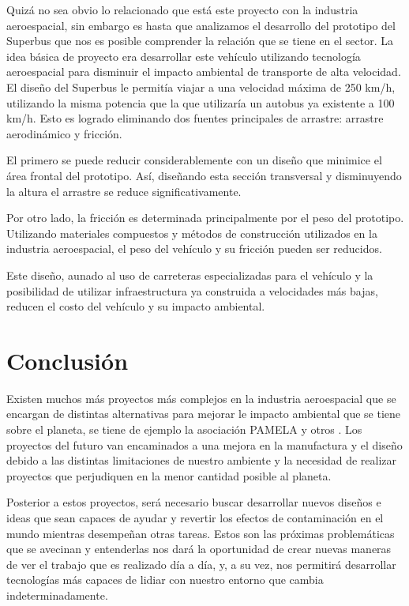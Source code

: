 \documentclass[12pt, letterpaper]{article}
\begin{document}
Quizá no sea obvio lo relacionado que está este proyecto con la industria aeroespacial, sin embargo es hasta que analizamos el desarrollo del prototipo del Superbus que nos es posible comprender la relación que se tiene en el sector. La idea básica de proyecto era desarrollar este vehículo utilizando tecnología aeroespacial para disminuir el impacto ambiental de transporte de alta velocidad. El diseño del Superbus le permitía viajar a una velocidad máxima de 250 km/h, utilizando la misma potencia que la que utilizaría un autobus ya existente a 100 km/h. Esto es logrado eliminando dos fuentes principales de arrastre: arrastre aerodinámico y fricción.

El primero se puede reducir considerablemente con un diseño que minimice el área frontal del prototipo. Así, diseñando esta sección transversal y disminuyendo la altura el arrastre se reduce significativamente.

Por otro lado, la fricción es determinada principalmente por el peso del prototipo. Utilizando materiales compuestos y métodos de construcción utilizados en la industria aeroespacial, el peso del vehículo y su fricción pueden ser reducidos.

Este diseño, aunado al uso de carreteras especializadas para el vehículo y la posibilidad de utilizar infraestructura ya construida a velocidades más bajas, reducen el costo del vehículo y su impacto ambiental. \parencite{melkert07}

\section*{Conclusión}
Existen muchos más proyectos más complejos en la industria aeroespacial que se encargan de distintas alternativas para mejorar le impacto ambiental que se tiene sobre el planeta, se tiene de ejemplo la asociación PAMELA y otros \parencite{sabaghi16}. Los proyectos del futuro van encaminados a una mejora en la manufactura y el diseño debido a las distintas limitaciones de nuestro ambiente y la necesidad de realizar proyectos que perjudiquen en la menor cantidad posible al planeta. 

Posterior a estos proyectos, será necesario buscar desarrollar nuevos diseños e ideas que sean capaces de ayudar y revertir los efectos de contaminación en el mundo mientras desempeñan otras tareas. Estos son las próximas problemáticas que se avecinan y entenderlas nos dará la oportunidad de crear nuevas maneras de ver el trabajo que es realizado día a día, y, a su vez, nos permitirá desarrollar tecnologías más capaces de lidiar con nuestro entorno que cambia indeterminadamente.



\renewcommand\refname{References}
\printbibliography
\end{document}
